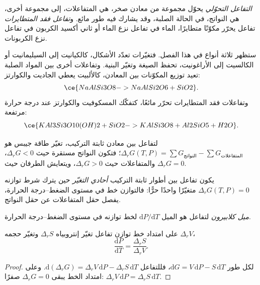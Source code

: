 \begin{definition}\label{def:b2:metamorphic-facies:reaction}
\emph{التفاعل التحوّلي} يحوّل مجموعة من معادن
صخر، هي المتفاعلات، إلى مجموعة أخرى، هي النواتج، في الحالة الصلبة، وقد
يشارك فيه طور مائع. و\emph{تفاعل فقد المتطايرات} تفاعل يحرّر مكوّنًا متطايرًا، الماء في تفاعل نزع الماء أو ثاني أكسيد
الكربون في تفاعل نزع الكربونات.
\end{definition}

ستظهر ثلاثة أنواع في هذا الفصل. فتغيّرات تعدّد الأشكال، كالكيانيت إلى
السيليمانيت أو الكالسيت إلى الأراغونيت، تحفظ الصيغة وتغيّر البنية.
وتفاعلات أخرى بين المواد الصلبة تعيد توزيع المكوّنات بين المعادن، كالألبيت
يعطي الجاديت والكوارتز:
\[
\ce{NaAlSi3O8 -> NaAlSi2O6 + SiO2}.
\]
وتفاعلات فقد المتطايرات تحرّر مائعًا، كتفكّك المسكوفيت والكوارتز
عند درجة حرارة مرتفعة:
\[
\ce{KAl3Si3O10(OH)2 + SiO2 -> KAlSi3O8 + Al2SiO5 + H2O}.
\]

لتفاعل بين معادن ثابتة التركيب، تغيّر طاقة جيبس هو
$\Delta_r G(T, P) = \sum G_{\text{النواتج}} - \sum G_{\text{المتفاعلات}}$؛ فتكون النواتج
مستقرة حيث $\Delta_r G < 0$، والمتفاعلات حيث $\Delta_r G > 0$، ويتعايش
الطرفان حيث $\Delta_r G = 0$.

\begin{definition}\label{def:b2:metamorphic-facies:univariant}
يكون تفاعل بين أطوار ثابتة التركيب \emph{أحادي التغيّر} حين يترك شرط توازنه $\Delta_r G(T, P) = 0$ متغيّرًا واحدًا
حرًّا: فالتوازن خط في مستوى الضغط--درجة الحرارة، يفصل
حقل المتفاعلات عن حقل النواتج.
\end{definition}

\begin{definition}\label{def:b2:metamorphic-facies:clapeyron}
\emph{ميل كلابيرون} لتفاعل هو الميل
$\mathrm dP/\mathrm dT$ لخط توازنه في مستوى الضغط--درجة الحرارة.
\end{definition}

\begin{proposition}\label{prop:b2:metamorphic-facies:clapeyron}
على امتداد خط توازن تفاعل تغيّر إنتروبياه $\Delta_r S$ وتغيّر
حجمه $\Delta_r V$،
\[
\frac{\mathrm dP}{\mathrm dT} = \frac{\Delta_r S}{\Delta_r V}.
\]
\end{proposition}

\begin{proof}
لكل طور $\mathrm dG = V\,\mathrm dP - S\,\mathrm dT$، فللتفاعل
$\mathrm d(\Delta_r G) = \Delta_r V\,\mathrm dP - \Delta_r S\,\mathrm dT$. وعلى امتداد الخط
يبقى $\Delta_r G = 0$ صفرًا: $\Delta_r V\,\mathrm dP = \Delta_r S\,\mathrm dT$.
\end{proof}

